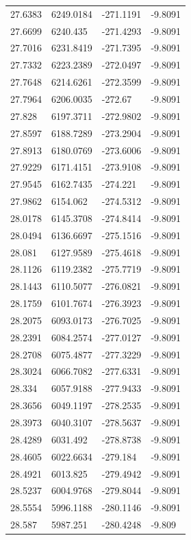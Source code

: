 \begin{table}[H]
\begin{tabular}{llll}
27.6383 & 6249.0184 & -271.1191 & -9.8091 \\
27.6699 & 6240.435 & -271.4293 & -9.8091 \\
27.7016 & 6231.8419 & -271.7395 & -9.8091 \\
27.7332 & 6223.2389 & -272.0497 & -9.8091 \\
27.7648 & 6214.6261 & -272.3599 & -9.8091 \\
27.7964 & 6206.0035 & -272.67 & -9.8091 \\
27.828 & 6197.3711 & -272.9802 & -9.8091 \\
27.8597 & 6188.7289 & -273.2904 & -9.8091 \\
27.8913 & 6180.0769 & -273.6006 & -9.8091 \\
27.9229 & 6171.4151 & -273.9108 & -9.8091 \\
27.9545 & 6162.7435 & -274.221 & -9.8091 \\
27.9862 & 6154.062 & -274.5312 & -9.8091 \\
28.0178 & 6145.3708 & -274.8414 & -9.8091 \\
28.0494 & 6136.6697 & -275.1516 & -9.8091 \\
28.081 & 6127.9589 & -275.4618 & -9.8091 \\
28.1126 & 6119.2382 & -275.7719 & -9.8091 \\
28.1443 & 6110.5077 & -276.0821 & -9.8091 \\
28.1759 & 6101.7674 & -276.3923 & -9.8091 \\
28.2075 & 6093.0173 & -276.7025 & -9.8091 \\
28.2391 & 6084.2574 & -277.0127 & -9.8091 \\
28.2708 & 6075.4877 & -277.3229 & -9.8091 \\
28.3024 & 6066.7082 & -277.6331 & -9.8091 \\
28.334 & 6057.9188 & -277.9433 & -9.8091 \\
28.3656 & 6049.1197 & -278.2535 & -9.8091 \\
28.3973 & 6040.3107 & -278.5637 & -9.8091 \\
28.4289 & 6031.492 & -278.8738 & -9.8091 \\
28.4605 & 6022.6634 & -279.184 & -9.8091 \\
28.4921 & 6013.825 & -279.4942 & -9.8091 \\
28.5237 & 6004.9768 & -279.8044 & -9.8091 \\
28.5554 & 5996.1188 & -280.1146 & -9.8091 \\
28.587 & 5987.251 & -280.4248 & -9.809 \\

\end{tabular}
\end{table}
